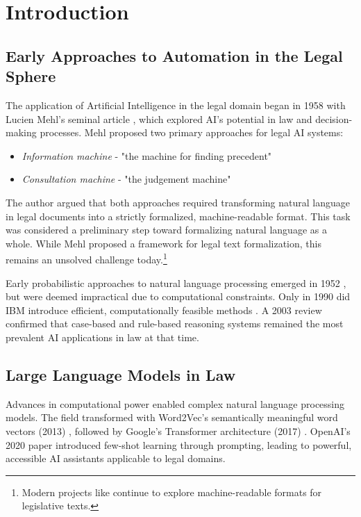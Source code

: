\chapter{Introduction}
\label{chap:intro}
\chaptermark{}

\section{Early Approaches to Automation in the Legal Sphere}
\label{sec:early}

The application of Artificial Intelligence in the legal domain began in 1958 with Lucien Mehl's seminal article \cite{automation_in_legal_1958}, which explored AI's potential in law and decision-making processes. Mehl proposed two primary approaches for legal AI systems:
\begin{itemize}
    \item \textit{Information machine} - "the machine for finding precedent"
    \item \textit{Consultation machine} - "the judgement machine"
\end{itemize}

The author argued that both approaches required transforming natural language in legal documents into a strictly formalized, machine-readable format. This task was considered a preliminary step toward formalizing natural language as a whole. While Mehl proposed a framework for legal text formalization, this remains an unsolved challenge today.\footnote{
    Modern projects like \cite{merigouxCatalaProgrammingLanguage2021} continue to explore machine-readable formats for legislative texts.
}

Early probabilistic approaches to natural language processing emerged in 1952 \cite{weaverTranslation1952}, but were deemed impractical due to computational constraints. Only in 1990 did IBM introduce efficient, computationally feasible methods \cite{brownStatisticalApproachMachine1990}. A 2003 review \cite{risslandAILawFruitful2003} confirmed that case-based and rule-based reasoning systems remained the most prevalent AI applications in law at that time.

\section{Large Language Models in Law}
Advances in computational power enabled complex natural language processing models. The field transformed with Word2Vec's semantically meaningful word vectors (2013) \cite{mikolovEfficientEstimationWord2013}, followed by Google's Transformer architecture (2017) \cite{vaswaniAttentionAllYou2017}. OpenAI's 2020 paper \cite{brownLanguageModelsAre2020} introduced few-shot learning through prompting, leading to powerful, accessible AI assistants applicable to legal domains.

